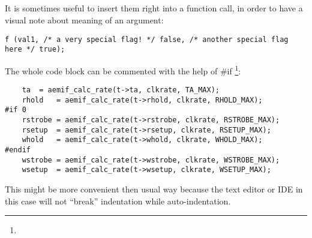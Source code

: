 ﻿\subsection{}

{It is sometimes useful to insert them right into a function call, in order to have a visual note
about meaning of an argument}:

\begin{lstlisting}
f (val1, /* a very special flag! */ false, /* another special flag here */ true);
\end{lstlisting}

{The whole code block can be commented with the help of} \#if
\footnote{}:

\begin{lstlisting}
	ta	= aemif_calc_rate(t->ta, clkrate, TA_MAX);
	rhold	= aemif_calc_rate(t->rhold, clkrate, RHOLD_MAX);
#if 0	
	rstrobe	= aemif_calc_rate(t->rstrobe, clkrate, RSTROBE_MAX);
	rsetup	= aemif_calc_rate(t->rsetup, clkrate, RSETUP_MAX);
	whold	= aemif_calc_rate(t->whold, clkrate, WHOLD_MAX);
#endif	
	wstrobe	= aemif_calc_rate(t->wstrobe, clkrate, WSTROBE_MAX);
	wsetup	= aemif_calc_rate(t->wsetup, clkrate, WSETUP_MAX);
\end{lstlisting}

{This might be more convenient then usual way because the text editor or \ac{IDE} in this case will not ``break''
indentation while auto-indentation}.

